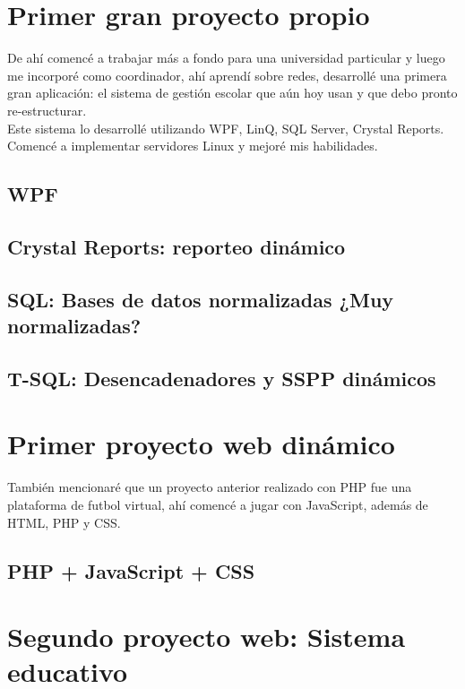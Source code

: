 \documentclass[12pt,spanish,lettersize]{book}
\begin{document}
\section{Primer gran proyecto propio}

De ahí comencé a trabajar más a fondo para una universidad particular y luego me incorporé como coordinador, ahí aprendí sobre redes, desarrollé una primera gran aplicación: el sistema de gestión escolar que aún hoy usan y que debo pronto re-estructurar.\\

Este sistema lo desarrollé utilizando WPF, LinQ, SQL Server, Crystal Reports. Comencé a implementar servidores Linux y mejoré mis habilidades.\\
\subsection{WPF}
\subsection{Crystal Reports: reporteo dinámico}
\subsection{SQL: Bases de datos normalizadas ¿Muy normalizadas?}
\subsection{T-SQL: Desencadenadores y SSPP dinámicos}
\section{Primer proyecto web dinámico}

También mencionaré que un proyecto anterior realizado con PHP fue una plataforma de futbol virtual, ahí comencé a jugar con JavaScript, además de HTML, PHP y CSS.\\
\subsection{PHP + JavaScript + CSS}
\section{Segundo proyecto web: Sistema educativo}
\end{document}

